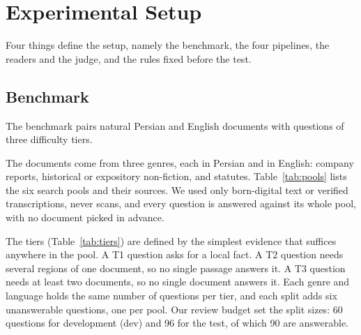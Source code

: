 \section{Experimental Setup}
\label{sec:methods}

Four things define the setup, namely the benchmark, the four pipelines, the readers and the judge, and the rules fixed before the test.

\subsection{Benchmark}
\label{sec:benchmark}
The benchmark pairs natural Persian and English documents with questions of three difficulty tiers.



The documents come from three genres, each in Persian and in English: company reports, historical or expository non-fiction, and statutes. Table~\ref{tab:pools} lists the six search pools and their sources. We used only born-digital text or verified transcriptions, never scans, and every question is answered against its whole pool, with no document picked in advance.

The tiers (Table~\ref{tab:tiers}) are defined by the simplest evidence that suffices anywhere in the pool. A T1 question asks for a local fact. A T2 question needs several regions of one document, so no single passage answers it. A T3 question needs at least two documents, so no single document answers it. Each genre and language holds the same number of questions per tier, and each split adds six unanswerable questions, one per pool. Our review budget set the split sizes: 60 questions for development (dev) and 96 for the test, of which 90 are answerable.

